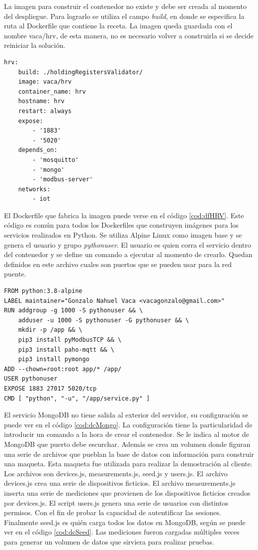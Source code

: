 La imagen para construir el contenedor no existe y debe ser creada al momento del despliegue.
Para lograrlo se utiliza el campo \emph{build}, en donde se especifica la ruta al Dockerfile que contiene la receta.
La imagen queda guardada con el nombre vaca/hrv, de esta manera, no es necesario volver a construirla si se decide reiniciar la solución.

\begin{lstlisting}[label=cod:dcHRV,caption=Orquestación del servicio hrv.]
hrv:
	build: ./holdingRegistersValidator/
	image: vaca/hrv
	container_name: hrv
	hostname: hrv
	restart: always
	expose: 
		- '1883'
		- '5020'
	depends_on: 
		- 'mosquitto'
		- 'mongo'
		- 'modbus-server'
	networks: 
		- iot
\end{lstlisting}

El Dockerfile que fabrica la imagen puede verse en el código \ref{cod:dfHRV}.
Este código es común para todos los Dockerfiles que construyen imágenes para los servicios realizados en Python.
Se utiliza Alpine Linux como imagen base y se genera el usuario y grupo \emph{pythonuser}.
El usuario es quien corra el servicio dentro del contenedor y se define un comando a ejecutar al momento de crearlo.
Quedan definidos en este archivo cuales son puertos que se pueden usar para la red puente.

\begin{lstlisting}[label=cod:dfHRV,caption=Dockerfile del servicio hrv.]
FROM python:3.8-alpine
LABEL maintainer="Gonzalo Nahuel Vaca <vacagonzalo@gmail.com>"
RUN addgroup -g 1000 -S pythonuser && \
	adduser -u 1000 -S pythonuser -G pythonuser && \
	mkdir -p /app && \
	pip3 install pyModbusTCP && \
	pip3 install paho-mqtt && \
	pip3 install pymongo
ADD --chown=root:root app/* /app/
USER pythonuser
EXPOSE 1883 27017 5020/tcp
CMD [ "python", "-u", "/app/service.py" ]
\end{lstlisting}

El servicio MongoDB no tiene salida al exterior del servidor, su configuración se puede ver en el código \ref{cod:dcMongo}.
La configuración tiene la particularidad de introducir un comando a la hora de crear el contenedor.
Se le indica al motor de MongoDB que puerto debe escurchar.
Además se crea un volumen donde figuran una serie de archivos que pueblan la base de datos con información para construir una maqueta.
Esta maqueta fue utilizada para realizar la demostración al cliente.
Los archivos son devices.js, measurements.js, seed.js y users.js.
El archivo devices.js crea una serie de dispositivos ficticios.
El archivo measurements.js inserta una serie de mediciones que provienen de los dispositivos ficticios creados por devices.js.
El script users.js genera una serie de usuarios con distintos permisos.
Con el fin de probar la capacidad de autentificar las sesiones.
Finalmente seed.js es quién carga todos los datos en MongoDB, según se puede ver en el código \ref{cod:dcSeed}.
Las mediciones fueron cargadas múltiples veces para generar un volumen de datos que sirviera para realizar pruebas.

